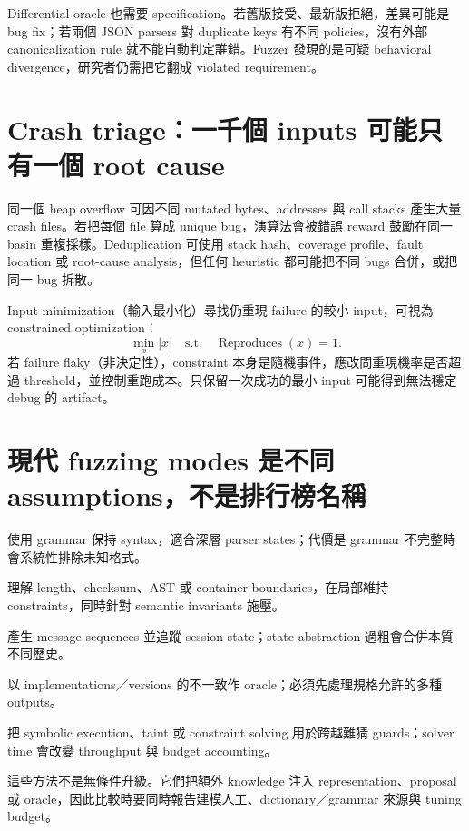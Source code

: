 \documentclass[11pt,a4paper,oneside,openany]{book}
\begin{document}
Differential oracle 也需要 specification。若舊版接受、最新版拒絕，差異可能是 bug fix；若兩個 JSON parsers 對 duplicate keys 有不同 policies，沒有外部 canonicalization rule 就不能自動判定誰錯。Fuzzer 發現的是可疑 behavioral divergence，研究者仍需把它翻成 violated requirement。

\section{Crash triage：一千個 inputs 可能只有一個 root cause}
同一個 heap overflow 可因不同 mutated bytes、addresses 與 call stacks 產生大量 crash files。若把每個 file 算成 unique bug，演算法會被錯誤 reward 鼓勵在同一 basin 重複採樣。Deduplication 可使用 stack hash、coverage profile、fault location 或 root-cause analysis，但任何 heuristic 都可能把不同 bugs 合併，或把同一 bug 拆散。

Input minimization（輸入最小化）尋找仍重現 failure 的較小 input，可視為 constrained optimization：
\[
 \min_x |x|
 \quad\text{s.t.}\quad
 \operatorname{Reproduces}(x)=1.
\]
若 failure flaky（非決定性），constraint 本身是隨機事件，應改問重現機率是否超過 threshold，並控制重跑成本。只保留一次成功的最小 input 可能得到無法穩定 debug 的 artifact。

\section{現代 fuzzing modes 是不同 assumptions，不是排行榜名稱}
\begin{description}[style=nextline,leftmargin=1.8em,labelindent=0pt,labelsep=.6em]
\item[Grammar-aware fuzzing] 使用 grammar 保持 syntax，適合深層 parser states；代價是 grammar 不完整時會系統性排除未知格式。
\item[Structure-aware mutation] 理解 length、checksum、AST 或 container boundaries，在局部維持 constraints，同時針對 semantic invariants 施壓。
\item[Stateful fuzzing] 產生 message sequences 並追蹤 session state；state abstraction 過粗會合併本質不同歷史。
\item[Differential fuzzing] 以 implementations／versions 的不一致作 oracle；必須先處理規格允許的多種 outputs。
\item[Hybrid fuzzing] 把 symbolic execution、taint 或 constraint solving 用於跨越難猜 guards；solver time 會改變 throughput 與 budget accounting。
\end{description}
這些方法不是無條件升級。它們把額外 knowledge 注入 representation、proposal 或 oracle，因此比較時要同時報告建模人工、dictionary／grammar 來源與 tuning budget。
\end{document}
